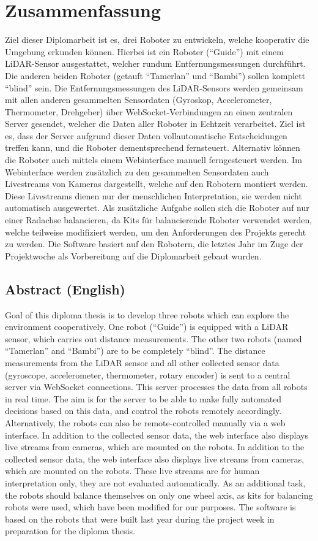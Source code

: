 
\chapter{Zusammenfassung}
Ziel dieser Diplomarbeit ist es, drei Roboter zu entwickeln,
welche kooperativ die Umgebung erkunden können.
%
Hierbei ist ein Roboter (``Guide'') mit einem LiDAR-Sensor ausgestattet,
welcher rundum Entfernungsmessungen durchführt.
%
Die anderen beiden Roboter (getauft ``Tamerlan'' und ``Bambi'')
sollen komplett ``blind'' sein.
%
Die Entfernungsmessungen des LiDAR-Sensors werden
gemeinsam mit allen anderen gesammelten Sensordaten
(Gyroskop, Accelerometer, Thermometer, Drehgeber)
über WebSocket-Verbindungen an einen zentralen Server gesendet,
welcher die Daten aller Roboter in Echtzeit verarbeitet.
%
Ziel ist es, dass der Server aufgrund dieser Daten
vollautomatische Entscheidungen treffen kann,
und die Roboter dementsprechend fernsteuert.
%
Alternativ können die Roboter auch mittels einem Webinterface manuell ferngesteuert werden.
%
Im Webinterface werden zusätzlich zu den gesammelten Sensordaten
auch Livestreams von Kameras dargestellt,
welche auf den Robotern montiert werden.
%
Diese Livestreams dienen nur der menschlichen Interpretation,
sie werden nicht automatisch ausgewertet.
%
Als zusätzliche Aufgabe sollen sich die Roboter auf nur einer Radachse balancieren,
da Kits für balancierende Roboter verwendet werden,
welche teilweise modifiziert werden,
um den Anforderungen des Projekts gerecht zu werden.
%
Die Software basiert auf den Robotern,
die letztes Jahr im Zuge der Projektwoche als Vorbereitung auf die Diplomarbeit gebaut wurden.

\section{Abstract (English)}
Goal of this diploma thesis is to develop three robots which
can explore the environment cooperatively.
%
One robot (``Guide'') is equipped with a LiDAR sensor,
which carries out distance measurements.
%
The other two robots (named ``Tamerlan'' and ``Bambi'')
are to be completely ``blind''.
%
The distance measurements from the LiDAR sensor and all other collected sensor data
(gyroscope, accelerometer, thermometer, rotary encoder)
is sent to a central server via WebSocket connections.
This server processes the data from all robots in real time.
%
The aim is for the server to be able to make fully automated decisions based on this data,
and control the robots remotely accordingly.
%
Alternatively, the robots can also be remote-controlled manually via a web interface.
%
In addition to the collected sensor data,
the web interface also displays live streams from cameras,
which are mounted on the robots.
%
In addition to the collected sensor data, the web interface
also displays live streams from cameras,
which are mounted on the robots.
%
These live streams are for human interpretation only,
they are not evaluated automatically.
%
As an additional task, the robots should balance themselves on only one wheel axis,
as kits for balancing robots were used,
which have been modified for our purposes.
The software is based on the robots
that were built last year during the project week in preparation for the diploma thesis.